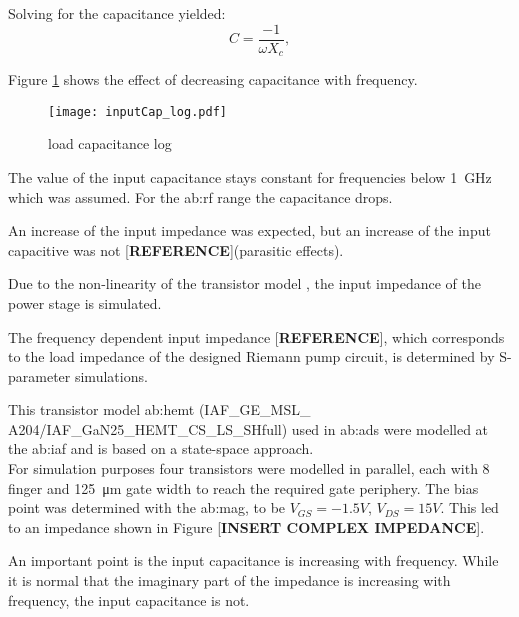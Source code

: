 Solving for the capacitance yielded:
\begin{equation}
	C = \frac{-1}{\omega X_c},
\end{equation}

Figure \ref{fig:inputCap_log} shows the effect of decreasing capacitance with frequency.

\begin{figure}[ht]
	\centering
  \texttt{[image: inputCap\_log.pdf]}
	\caption{load capacitance log}
	\label{fig:inputCap_log}
\end{figure}

The value of the input capacitance stays constant for frequencies below \SI{1}{\giga \hertz} which was assumed. 
For the \gls{ab:rf} range the capacitance drops.

An increase of the input impedance was expected, but an increase of the input capacitive was not [\textbf{REFERENCE}](parasitic effects).

Due to the non-linearity of the transistor model \cite{vitanovnon}, the input impedance of the power stage is simulated.

The frequency dependent input impedance [\textbf{REFERENCE}], which corresponds to the load impedance of the designed Riemann pump circuit, is determined by S-parameter simulations.

This transistor model \gls{ab:hemt} (IAF\_GE\_MSL\_ A204/IAF\_GaN25\_HEMT\_CS\_LS\_SHfull) used in \gls{ab:ads} were modelled at the \gls{ab:iaf}\cite{model} and is based on a state-space approach.\\ 
For simulation purposes four transistors were modelled in parallel, each with 8 finger and \SI{125}{\micro \metre} gate width to reach the required gate periphery.
The bias point was determined with the \gls{ab:mag}, to be $V_{GS} = -1.5 V$, $V_{DS} = 15 V$.
This led to an impedance shown in Figure [\textbf{INSERT COMPLEX IMPEDANCE}].


An important point is the input capacitance is increasing with frequency. 
While it is normal that the imaginary part of the impedance is increasing with frequency, the input capacitance is not.

